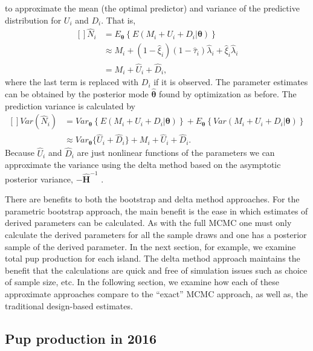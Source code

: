 \documentclass[fleqn,10pt]{wlscirep}
\begin{document}
{to approximate the mean (the optimal predictor) and variance of the predictive distribution for \(U_i\) and \(D_i\). That is,
\[
\begin{aligned}[]
\hat{N}_i &= E_{\boldsymbol{\theta}}\left\{ E(M_i + U_i + D_i|\boldsymbol{\theta}) \right\} \\
&\approx M_i + (1-\hat{\xi}_i)(1-\hat{\tau}_i)\hat{\lambda}_i + \hat{\xi}_i\hat{\lambda}_i\\
&= M_i + \hat{U}_i + \hat{D}_i,
\end{aligned}
\]
where the last term is replaced with \(D_i\) if it is observed. The parameter estimates can be obtained by the posterior mode \(\hat{\boldsymbol{\theta}}\) found by optimization as before. The prediction variance is calculated by
\[
\begin{aligned}[]
Var(\hat{N}_i) &= Var_{\boldsymbol{\theta}}\left\{ E(M_i + U_i + D_i|\boldsymbol{\theta}) \right\} + E_{\boldsymbol{\theta}}\left\{Var(M_i + U_i + D_i|\boldsymbol{\theta})\right\}
\\
&\approx Var_{\boldsymbol{\theta}}\{\hat{U}_i+\hat{D}_i\} + M_i + \hat{U}_i + \hat{D}_i.
\end{aligned}
\]
Because \(\hat{U}_i\) and \(\hat{D}_i\) are just nonlinear functions of the parameters we can approximate the variance using the delta method \cite{Dorfman:1938af} based on the asymptotic posterior variance, \(-\hat{\mathbf{H}}^{-1}\) \cite{johnson2010model}.

There are benefits to both the bootstrap and delta method approaches. For the parametric bootstrap approach, the main benefit is the ease in which estimates of derived parameters can be calculated. As with the full MCMC one must only calculate the derived parameters for all the sample draws and one has a posterior sample of the derived parameter. In the next section, for example, we examine total pup production for each island. The delta method approach maintains the benefit that the calculations are quick and free of simulation issues such as choice of sample size, etc. In the following section, we examine how each of these approximate approaches compare to the ``exact'' MCMC approach, as well as, the traditional design-based estimates.

\hypertarget{pup-production-in-2016}{%
\subsection{Pup production in 2016}\label{pup-production-in-2016}}

}
\end{document}
